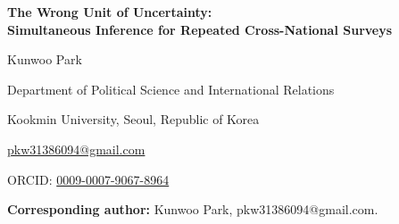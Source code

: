 \documentclass[11pt]{article}
\begin{document}
\thispagestyle{empty}
\begin{center}
{\Large\bfseries The Wrong Unit of Uncertainty:\\[2pt]
Simultaneous Inference for Repeated Cross-National Surveys\par}

\vspace{2em}

{\large Kunwoo Park\par}
\vspace{0.5em}
Department of Political Science and International Relations\par
Kookmin University, Seoul, Republic of Korea\par
\href{mailto:pkw31386094@gmail.com}{pkw31386094@gmail.com}\par
ORCID: \href{https://orcid.org/0009-0007-9067-8964}{0009-0007-9067-8964}\par
\end{center}

\vspace{2em}
\noindent\textbf{Corresponding author:} Kunwoo Park, pkw31386094@gmail.com.
\end{document}
